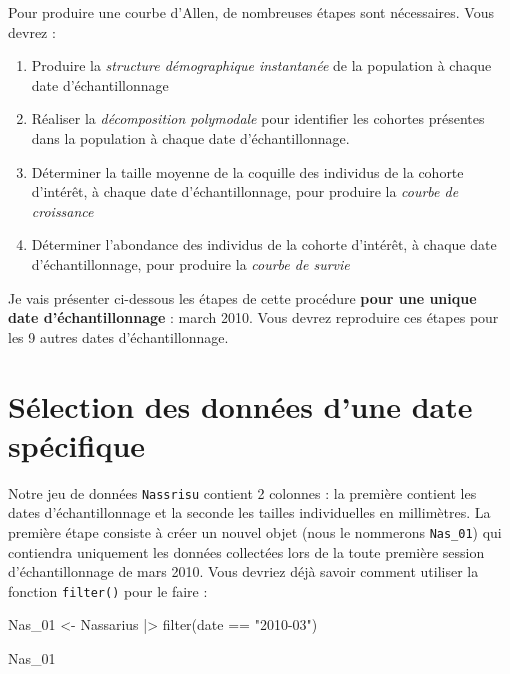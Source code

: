 \documentclass[
  french,
  a4paper,
  DIV=11,
  numbers=noendperiod,
  oneside]{scrreprt}
\newenvironment{Shaded}{}{}
\newcommand{\FunctionTok}[1]{\textcolor[rgb]{0.44,0.26,0.76}{#1}}
\newcommand{\NormalTok}[1]{\textcolor[rgb]{0.14,0.16,0.18}{#1}}
\newcommand{\OtherTok}[1]{\textcolor[rgb]{0.44,0.26,0.76}{#1}}
\newcommand{\SpecialCharTok}[1]{\textcolor[rgb]{0.00,0.36,0.77}{#1}}
\newcommand{\StringTok}[1]{\textcolor[rgb]{0.01,0.18,0.38}{#1}}
\providecommand{\tightlist}{%
  \setlength{\itemsep}{0pt}\setlength{\parskip}{0pt}}
\begin{document}
\begin{tcolorbox}
Pour produire une courbe d'Allen, de nombreuses étapes sont nécessaires.
Vous devrez :

\begin{enumerate}
\def\labelenumi{\arabic{enumi}.}
\tightlist
\item
  Produire la \emph{structure démographique instantanée} de la
  population à chaque date d'échantillonnage
\item
  Réaliser la \emph{décomposition polymodale} pour identifier les
  cohortes présentes dans la population à chaque date d'échantillonnage.
\item
  Déterminer la taille moyenne de la coquille des individus de la
  cohorte d'intérêt, à chaque date d'échantillonnage, pour produire la
  \emph{courbe de croissance}
\item
  Déterminer l'abondance des individus de la cohorte d'intérêt, à chaque
  date d'échantillonnage, pour produire la \emph{courbe de survie}
\end{enumerate}

Je vais présenter ci-dessous les étapes de cette procédure \textbf{pour
une unique date d'échantillonnage} : march 2010. Vous devrez reproduire
ces étapes pour les 9 autres dates d'échantillonnage.

\section{Sélection des données d'une date
spécifique}\label{suxe9lection-des-donnuxe9es-dune-date-spuxe9cifique}

Notre jeu de données \texttt{Nassrisu} contient 2 colonnes : la première
contient les dates d'échantillonnage et la seconde les tailles
individuelles en millimètres. La première étape consiste à créer un
nouvel objet (nous le nommerons \texttt{Nas\_01}) qui contiendra
uniquement les données collectées lors de la toute première session
d'échantillonnage de mars 2010. Vous devriez déjà savoir comment
utiliser la fonction \texttt{filter()} pour le faire :

\begin{Shaded}
\begin{Highlighting}[]
\NormalTok{Nas\_01 }\OtherTok{\textless{}{-}}\NormalTok{ Nassarius }\SpecialCharTok{|\textgreater{}}
  \FunctionTok{filter}\NormalTok{(date }\SpecialCharTok{==} \StringTok{"2010{-}03"}\NormalTok{)}

\NormalTok{Nas\_01}
\end{Highlighting}
\end{Shaded}


\end{tcolorbox}
\end{document}
